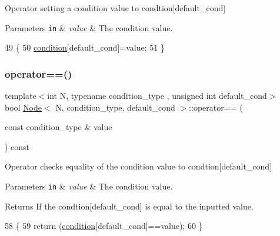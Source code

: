 Operator setting a condition value to {\ttfamily condtion}\mbox{[}{\ttfamily default\+\_\+cond}\mbox{]} 
\begin{DoxyParams}[1]{Parameters}
\mbox{\tt in}  & {\em value} & The condition value. \\
\hline
\end{DoxyParams}

\begin{DoxyCode}
49     \{
50         \hyperlink{struct_node_a84fa4c586396e81041eb3a4f6a46f418}{condition}[default\_cond]=value;
51     \}
\end{DoxyCode}
\mbox{\label{struct_node_a971919f93889cf8d00a6e28bd4fe947e}} 
\subsubsection{\texorpdfstring{operator==()}{operator==()}}
{\footnotesize\ttfamily template$<$int N, typename condition\+\_\+type , unsigned int default\+\_\+cond$>$ \\
bool \hyperlink{struct_node}{Node}$<$ N, condition\+\_\+type, default\+\_\+cond $>$\+::operator== (\begin{DoxyParamCaption}\item[{const condition\+\_\+type \&}]{value }\end{DoxyParamCaption}) const\hspace{0.3cm}{\ttfamily [inline]}}

Operator checks equality of the condition value to {\ttfamily condtion}\mbox{[}{\ttfamily default\+\_\+cond}\mbox{]} 
\begin{DoxyParams}[1]{Parameters}
\mbox{\tt in}  & {\em value} & The condition value. \\
\hline
\end{DoxyParams}
\begin{DoxyReturn}{Returns}
If the {\ttfamily condtion}\mbox{[}{\ttfamily default\+\_\+cond}\mbox{]} is equal to the inputted value. 
\end{DoxyReturn}

\begin{DoxyCode}
58     \{
59         \textcolor{keywordflow}{return} (\hyperlink{struct_node_a84fa4c586396e81041eb3a4f6a46f418}{condition}[default\_cond]==value);
60     \}
\end{DoxyCode}
\mbox{\label{struct_node_a8a002b9ad673ecc9715803e374481018}} 
